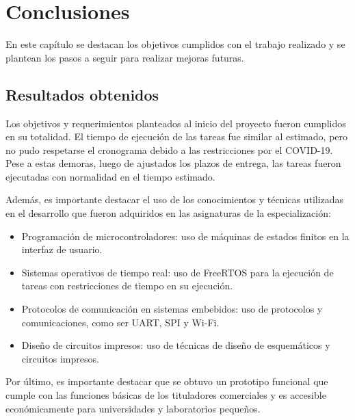 
\chapter{Conclusiones} %

\label{Chapter5} %



En este capítulo se destacan los objetivos cumplidos con el trabajo realizado y se plantean los pasos a seguir para realizar mejoras futuras.


\section{Resultados obtenidos }

Los objetivos y requerimientos planteados al inicio del proyecto fueron cumplidos en su totalidad. El tiempo de ejecución de las tareas fue similar al estimado, pero no pudo respetarse el cronograma debido a las restricciones por el COVID-19. Pese a estas demoras, luego de ajustados los plazos de entrega, las tareas fueron ejecutadas con normalidad en el tiempo estimado.

Además, es importante destacar el uso de los conocimientos y técnicas utilizadas en el desarrollo que fueron adquiridos en las asignaturas de la especialización:
\begin{itemize}
 \item Programación de microcontroladores: uso de máquinas de estados finitos en la interfaz de usuario.
 \item Sistemas operativos de tiempo real: uso de FreeRTOS para la ejecución de tareas con restricciones de tiempo en su ejecución.
 \item Protocolos de comunicación en sistemas embebidos: uso de protocolos y comunicaciones, como ser UART, SPI y Wi-Fi.
 \item Diseño de circuitos impresos: uso de técnicas de diseño de esquemáticos y circuitos impresos.
\end{itemize}

Por último, es importante destacar que se obtuvo un prototipo funcional que cumple con las funciones básicas de los tituladores comerciales y es accesible económicamente para universidades y laboratorios pequeños.


